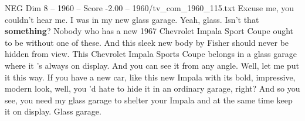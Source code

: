 \begin{textsample}{NEG Dim 8 – 1960 – Score -2.00 – 1960/tv\_com\_1960\_115.txt}  \label{ex:f8_neg_033}
Excuse me, you couldn't hear me.
I was in my new glass garage.
Yeah, glass.
Isn't that \textbf{something}?
Nobody who has a new 1967 Chevrolet Impala Sport Coupe ought to be without one of these.
And this sleek new body by Fisher should never be hidden from view.
This Chevrolet Impala Sports Coupe belongs in a glass garage where it 's always on display.
And you can see it from any angle.
Well, let me put it this way.
If you have a new car, like this new Impala with its bold, impressive, modern look, well, you 'd hate to hide it in an ordinary garage, right?
And so you see, you need my glass garage to shelter your Impala and at the same time keep it on display.
Glass garage.

\end{textsample}
